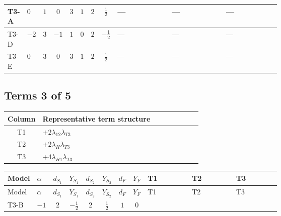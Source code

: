 \documentclass[8pt]{article}
\begin{document}
\begin{landscape}
\begin{longtable}{@{}llcccccc >{\raggedright\arraybackslash}p{0.21\linewidth} >{\raggedright\arraybackslash}p{0.21\linewidth} >{\raggedright\arraybackslash}p{0.21\linewidth}@{}}
\midrule
T3-A & $0$ & $1$ & $0$ & $3$ & $1$ & $2$ & $\frac{1}{2}$ & --- & --- & --- \\
\midrule
T3-D & $-2$ & $3$ & $-1$ & $1$ & $0$ & $2$ & $-\frac{1}{2}$ & --- & --- & --- \\
\midrule
T3-E & $0$ & $3$ & $0$ & $3$ & $1$ & $2$ & $\frac{1}{2}$ & --- & --- & --- \\
\midrule
\bottomrule
\end{longtable}
\clearpage
\subsection*{Terms 3 of 5}
\begin{center}
\begin{tabular}{@{}c >{\raggedright\arraybackslash}p{0.82\linewidth}@{}}
\toprule
Column & Representative term structure \\
\midrule
T1 & \(\displaystyle +2 {\lambda_{12}} {\lambda_{T3}}\) \\
\midrule
T2 & \(\displaystyle +2 {\lambda_H} {\lambda_{T3}}\) \\
\midrule
T3 & \(\displaystyle +4 {\lambda_{H1}} {\lambda_{T3}}\) \\
\midrule
\bottomrule
\end{tabular}
\end{center}
\smallskip
\tiny
\begin{longtable}{@{}llcccccc >{\raggedright\arraybackslash}p{0.21\linewidth} >{\raggedright\arraybackslash}p{0.21\linewidth} >{\raggedright\arraybackslash}p{0.21\linewidth}@{}}
\toprule
Model & $\alpha$ & $d_{S_1}$ & $Y_{S_1}$ & $d_{S_2}$ & $Y_{S_2}$ & $d_F$ & $Y_F$ & T1 & T2 & T3 \\
\midrule
\endfirsthead
\toprule
Model & $\alpha$ & $d_{S_1}$ & $Y_{S_1}$ & $d_{S_2}$ & $Y_{S_2}$ & $d_F$ & $Y_F$ & T1 & T2 & T3 \\
\midrule
\endhead
T3-B & $-1$ & $2$ & $-\frac{1}{2}$ & $2$ & $\frac{1}{2}$ & $1$ & $0$ & \scriptsize\adjustbox{max width=\linewidth}{$\begin{gathered} +2 {\lambda_{12}} {\lambda_{T3}}\end{gathered}$} & \scriptsize\adjustbox{max width=\linewidth}{$\begin{gathered} +2 {\lambda_H} {\lambda_{T3}}\end{gathered}$} & \scriptsize\adjustbox{max width=\linewidth}{$\begin{gathered} +4 {\lambda_{H1}} {\lambda_{T3}}\end{gathered}$} \\

\end{longtable}
\end{landscape}
\end{document}
